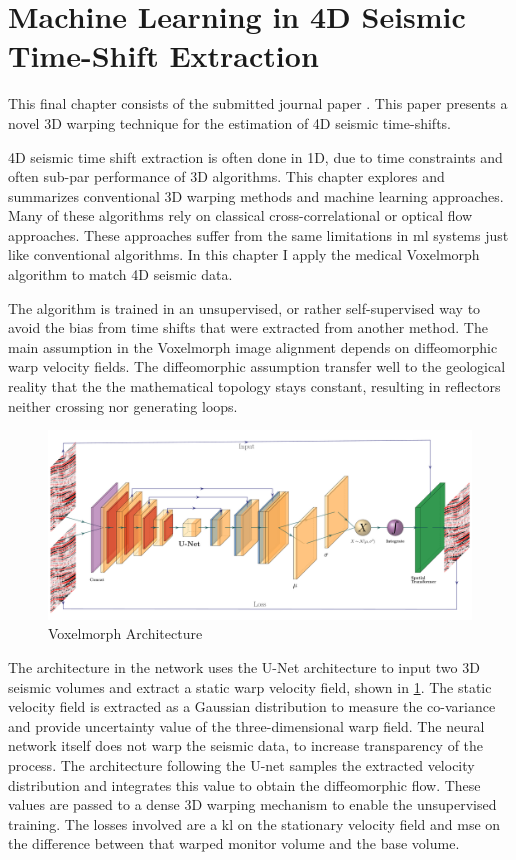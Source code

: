 \section{Machine Learning in 4D Seismic Time-Shift Extraction}

This final chapter consists of the submitted journal paper . This paper presents a novel 3D warping technique for the estimation of 4D seismic time-shifts.

4D seismic time shift extraction is often done in 1D, due to time constraints and often sub-par performance of 3D algorithms. This chapter explores and summarizes conventional 3D warping methods and machine learning approaches. Many of these algorithms rely on classical cross-correlational or optical flow approaches. These approaches suffer from the same limitations in \acl{ml} systems just like conventional algorithms. In this chapter I apply the medical Voxelmorph algorithm to match 4D seismic data.

The algorithm is trained in an unsupervised, or rather self-supervised way to avoid the bias from time shifts that were extracted from another method. The main assumption in the Voxelmorph image alignment depends on diffeomorphic warp velocity fields. The diffeomorphic assumption transfer well to the geological reality that the the mathematical topology stays constant, resulting in reflectors neither crossing nor generating loops. 

\begin{figure}
    \centering
    \includegraphics[width=\textwidth]{figures/Voxelmorph.pdf}
    \caption{Voxelmorph Architecture}
    \label{fig:voxelmorph}
\end{figure}

The architecture in the network uses the U-Net architecture to input two 3D seismic volumes and extract a static warp velocity field, shown in \cref{fig:voxelmorph}. The static velocity field is extracted as a Gaussian distribution to measure the co-variance and provide uncertainty value of the three-dimensional warp field. The neural network itself does not warp the seismic data, to increase transparency of the process. The architecture following the U-net samples the extracted velocity distribution and integrates this value to obtain the diffeomorphic flow. These values are passed to a dense 3D warping mechanism to enable the unsupervised training. The losses involved are a \acf{kl} on the stationary velocity field and \ac{mse} on the difference between that warped monitor volume and the base volume.

